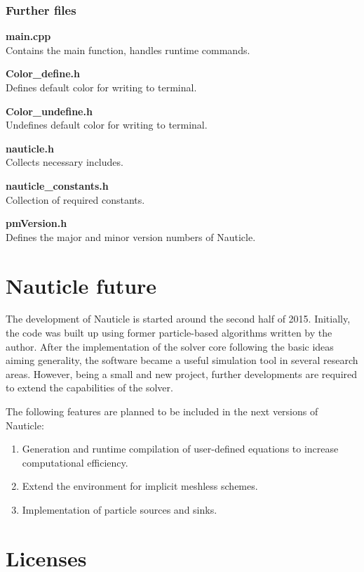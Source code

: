 \documentclass[a4paper,12pt,openany]{book}
\theoremstyle{break}
\begin{document}
\subsubsection{Further files}

\textbf{main.cpp} \\
Contains the main function, handles runtime commands.

\textbf{Color\_define.h} \\
Defines default color for writing to terminal.

\textbf{Color\_undefine.h} \\
Undefines default color for writing to terminal.

\textbf{nauticle.h} \\
Collects necessary includes.

\textbf{nauticle\_constants.h} \\
Collection of required constants.

\textbf{pmVersion.h} \\
Defines the major and minor version numbers of Nauticle.


\section{Nauticle future}
The development of Nauticle is started around the second half of 2015. Initially, the code was built up using former particle-based algorithms written by the author. After the implementation of the solver core following the basic ideas aiming generality, the software became a useful simulation tool in several research areas. However, being a small and new project, further developments are required to extend the capabilities of the solver.

The following features are planned to be included in the next versions of Nauticle:
\begin{enumerate}
\item Generation and runtime compilation of user-defined equations to increase computational efficiency.
\item Extend the environment for implicit meshless schemes.
\item Implementation of particle sources and sinks.
\end{enumerate}


\renewcommand{\bibname}{References}


\newpage
\section{Licenses}
\end{document}
